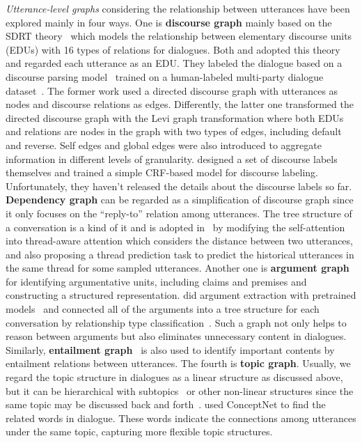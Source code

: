 \textit{Utterance-level graphs} considering the relationship between utterances have been explored mainly in four ways. 
One is \textbf{discourse graph} mainly based on the SDRT theory~\cite{asher2003logics} which models the relationship between elementary discourse units (EDUs) with 16 types of relations for dialogues. Both \citet{chen2021structure} and \citet{feng2020dialogue} adopted this theory and regarded each utterance as an EDU. They labeled the dialogue based on a discourse parsing model~\cite{shi2019deep} trained on a human-labeled multi-party dialogue dataset~\cite{asher2016discourse}. 
The former work used a directed discourse graph with utterances as nodes and discourse relations as edges.
Differently, the latter one transformed the directed discourse graph with the Levi graph transformation where both EDUs and relations are nodes in the graph with two types of edges, including default and reverse.  Self edges and global edges were also introduced to aggregate information in different levels of granularity.
\citet{ganesh2019restructuring} designed a set of discourse labels themselves and trained a simple CRF-based model for discourse labeling. Unfortunately, they haven't released the details about the discourse labels so far.
\textbf{Dependency graph} can be regarded as a simplification of discourse graph since it only focuses on the ``reply-to'' relation among utterances.
The tree structure of a conversation is a kind of it and is adopted in~\cite{yang2022tanet} by modifying the self-attention into thread-aware attention which considers the distance between two utterances, and also proposing a thread prediction task to predict the historical utterances in the same thread for some sampled utterances.
Another one is \textbf{argument graph}~\cite{stede2016parallel} for identifying argumentative units, including claims and premises and constructing a structured representation. \citet{fabbri2021convosumm} did argument extraction with pretrained models~\cite{chakrabarty2019ampersand} and connected all of the arguments into a tree structure for each conversation by relationship type classification~\cite{mirko2020towards}. Such a graph not only helps to reason between arguments but also eliminates unnecessary content in dialogues. Similarly, \textbf{entailment graph}~\cite{MehdadCTN13} is also used to identify important contents by entailment relations between utterances.
The fourth is \textbf{topic graph}. Usually, we regard the topic structure in dialogues as a linear structure as discussed above, but it can be hierarchical with subtopics~\cite{carletta2005ami, janin2003icsi} or other non-linear structures since the same topic may be discussed back and forth~\cite{kim2019dynamic}.
\citet{lei2021finer} used ConceptNet to find the related words in dialogue. These words indicate the connections among utterances under the same topic, capturing more flexible topic structures.


